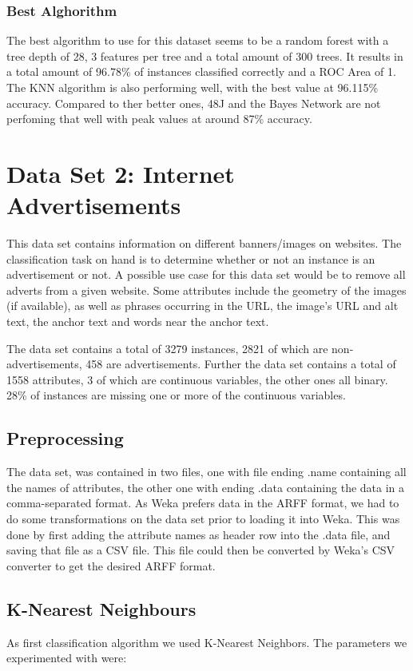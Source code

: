 \documentclass{article}
\begin{document}
\subsubsection{Best Alghorithm}
The best algorithm to use for this dataset seems to be a random forest with a tree depth of 28, 3 features per tree and a total amount of 300 trees. It results in a total amount of 96.78\% of instances classified correctly and a ROC Area of 1. The KNN algorithm is also performing well, with the best value at 96.115\% accuracy. Compared to ther better ones, 48J and the Bayes Network are not perfoming that well with peak values at around 87\% accuracy. 

\section{Data Set 2: Internet Advertisements}
This data set contains information on different banners/images on websites. The classification task on hand is to determine whether or not an instance is an advertisement or not. A possible use case for this data set would be to remove all adverts from a given website. Some attributes include the geometry of the images (if available), as well as phrases occurring in the URL, the image's URL and alt text, the anchor text and words near the anchor text.

The data set contains a total of 3279 instances, 2821 of which are non-advertisements, 458 are advertisements. Further the data set contains a total of 1558 attributes, 3 of which are continuous variables, the other ones all binary. 28\% of instances are missing one or more of the continuous variables.


\subsection{Preprocessing}
The data set, was contained in two files, one with file ending .name containing all the names of attributes, the other one with ending .data containing the data in a comma-separated format. As Weka prefers data in the ARFF format, we had to do some transformations on the data set prior to loading it into Weka. This was done by first adding the attribute names as header row into the .data file, and saving that file as a CSV file. This file could then be converted by Weka's CSV converter to get the desired ARFF format.

\subsection{K-Nearest Neighbours}
As first classification algorithm we used K-Nearest Neighbors. The parameters we experimented with were:
\end{document}
